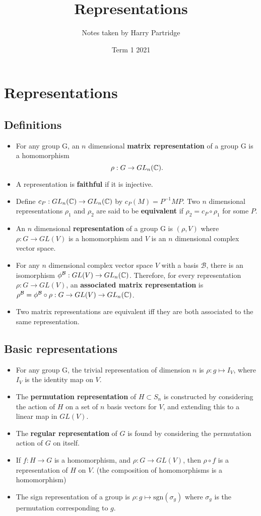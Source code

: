 \documentclass[a4paper]{article}
\title{Representations}
\author{Notes taken by Harry Partridge}
\date{Term 1 2021}
\begin{document}
\maketitle 
\tableofcontents

\newpage
\section{Representations}
\subsection{Definitions}
\begin{itemize}
    \item For any group G, an $n$ dimensional \textbf{matrix representation} of a group G is a homomorphism $$\rho: G \to GL_n(\mathbb{C}).$$
    \item A representation is \textbf{faithful} if it is injective.
    \item Define $c_P: GL_n(\mathbb{C}) \to GL_n(\mathbb{C})$ by $c_P(M) = P^{-1}MP$. Two $n$ dimensional representations $\rho_1$ and $\rho_2$ are said to be \textbf{equivalent} if $\rho_2 = c_P \circ \rho_1$ for some $P$.
    \item An $n$ dimensional \textbf{representation} of a group G is $(\rho, V)$ where $\rho: G \to GL(V)$ is a homomorphism and $V$ is an $n$ dimensional complex vector space.
    \item For any $n$ dimensional complex vector space $V$ with a basis $\mathcal{B}$, there is an isomorphism $\phi^\mathcal{B}: GL(V) \to GL_n(\mathbb{C})$. Therefore, for every representation $\rho: G \to GL(V)$, an \textbf{associated matrix representation} is $\rho^\mathcal{B} = \phi^\mathcal{B} \circ \rho: G \to GL(V) \to GL_n(\mathbb{C})$. 
    \item Two matrix representations are equivalent iff they are both associated to the same representation.
\end{itemize}

\subsection{Basic representations}
\begin{itemize}
    \item For any group G, the trivial representation of dimension $n$ is $\rho: g \mapsto I_V$, where $I_V$ is the identity map on $V$.
    \item The \textbf{permutation representation} of $H \subset S_n$ is constructed by considering the action of $H$ on a set of $n$ basis vectors for $V$, and extending this to a linear map in $GL(V)$.
    \item The \textbf{regular representation} of $G$ is found by considering the permutation action of $G$ on itself.
    \item If $f: H \to G$ is a homomorphism, and $\rho: G \to GL(V)$, then $\rho \circ f$ is a representation of $H$ on $V$. (the composition of homomorphisms is a homomorphism)
    \item The sign representation of a group is $\rho : g \mapsto \text{sgn}(\sigma_g)$ where $\sigma_g$ is the permutation corresponding to $g$.
\end{itemize}
\end{document}
